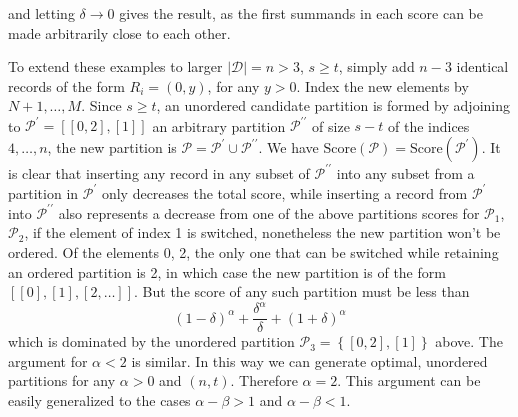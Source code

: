 \documentclass{article}
\theoremstyle{case}
\begin{document}
and letting $\delta \rightarrow 0$ gives the result, as the first summands in each score can be made arbitrarily close to each other.

To extend these examples to larger $\vert \mathcal{D} \vert = n > 3$, $s \geq t$, simply add $n-3$ identical records of the form $R_i = \left( 0, y\right)$, for any $y > 0$. Index the new elements by $N+1, \dots, M$. Since $s \geq t$, an unordered candidate partition is formed by adjoining to $\mathcal{P}^{\prime} = \left[\left[0, 2\right], \left[ 1\right]\right]$ an arbitrary partition $\mathcal{P}^{\prime\prime}$ of size $s - t$ of the indices $4, \dots, n$, the new partition is $\mathcal{P} = \mathcal{P}^{\prime} \cup \mathcal{P}^{\prime\prime}$. We have $\text{Score}\left(\mathcal{P}\right) = \text{Score}\left(\mathcal{P}^{\prime}\right)$. It is clear that inserting any record in any subset of $\mathcal{P}^{\prime\prime}$ into any subset from a partition in $\mathcal{P}^{\prime}$ only decreases the total score, while inserting a record from $\mathcal{P}^{\prime}$ into $\mathcal{P}^{\prime\prime}$ also represents a decrease from one of the above partitions scores for $\mathcal{P}_1$, $\mathcal{P}_2$, if the element of index 1 is switched, nonetheless the new partition won't be ordered. Of the elements 0, 2, the only one that can be switched while retaining an ordered partition is 2, in which case the new partition is of the form $\left[ \left[ 0\right], \left[ 1\right], \left[ 2, \dots\right]\right]$. But the score of any such partition must be less than
\[
\left( 1-\delta\right)^\alpha + \frac{\delta^\alpha}{\delta} + \left( 1+\delta\right)^\alpha
\]
which is dominated by the unordered partition $\mathcal{P}_3 = \left\lbrace \left[ 0, 2 \right], \left[ 1 \right]\right\rbrace$ above. The argument for $\alpha < 2$ is similar. In this way we can generate optimal, unordered partitions for any $\alpha > 0$ and $\left( n, t\right)$. Therefore $\alpha = 2$. This argument can be easily generalized to the cases $\alpha - \beta > 1$ and $\alpha - \beta < 1$. 
\end{document}
